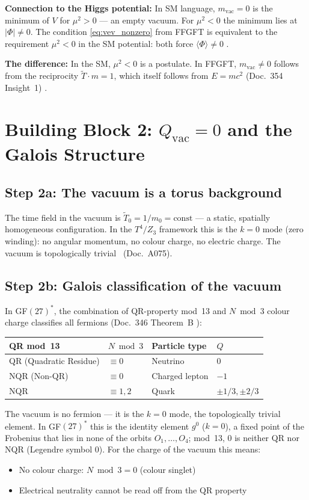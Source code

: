 \textbf{Connection to the Higgs potential:} In SM language, $m_\text{vac}=0$
is the minimum of $V$ for $\mu^2>0$ --- an empty vacuum. For $\mu^2<0$
the minimum lies at $|\Phi|\neq0$. The condition \eqref{eq:vev_nonzero}
from FFGFT is equivalent to the requirement $\mu^2<0$ in the SM potential:
both force $\langle\Phi\rangle\neq0$ \BM.

\textbf{The difference:} In the SM, $\mu^2<0$ is a postulate.
In FFGFT, $m_\text{vac}\neq0$ follows from the reciprocity
$\tilde{T}\cdot m=1$, which itself follows from $E=mc^2$
(Doc.~354 Insight~1) \BM.

\section{Building Block 2: $Q_\text{vac} = 0$ and the Galois Structure}

\subsection*{Step 2a: The vacuum is a torus background}

The time field in the vacuum is $\tilde{T}_0 = 1/m_0 = \text{const}$ --- a
static, spatially homogeneous configuration. In the $T^4/Z_3$ framework
this is the $k=0$ mode (zero winding): no angular momentum, no colour charge,
no electric charge. The vacuum is topologically trivial \BM\ (Doc.~A075).

\subsection*{Step 2b: Galois classification of the vacuum}

In GF$(27)^*$, the combination of QR-property mod~13 and $N\bmod3$
colour charge classifies all fermions (Doc.~346 Theorem~B \BM):

\begin{center}
\begin{tabular}{@{}llll@{}}
\toprule
QR mod~13 & $N\bmod3$ & Particle type & $Q$ \\
\midrule
QR (Quadratic Residue) & $\equiv 0$ & Neutrino & $0$ \\
NQR (Non-QR) & $\equiv 0$ & Charged lepton & $-1$ \\
NQR & $\equiv 1,2$ & Quark & $\pm1/3,\pm2/3$ \\
\bottomrule
\end{tabular}
\end{center}

The vacuum is no fermion --- it is the $k=0$ mode, the topologically trivial
element. In GF$(27)^*$ this is the identity element $g^0$ ($k = 0$), a fixed
point of the Frobenius that lies in none of the orbits $O_1,\dots,O_4$; mod~13,
$0$ is neither QR nor NQR (Legendre symbol $0$). For the charge of the vacuum
this means:
\begin{itemize}
  \item No colour charge: $N\bmod3 = 0$ (colour singlet) \BM
  \item Electrical neutrality cannot be read off from the QR property \SM
\end{itemize}

